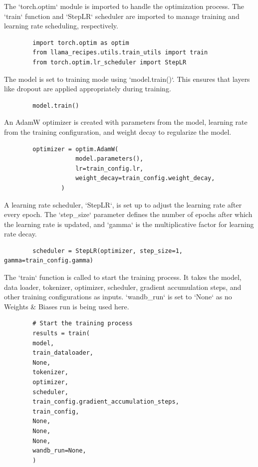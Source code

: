 \documentclass{solutionclass} %
\begin{document}
\begin{solution}
	The `torch.optim` module is imported to handle the optimization process. The `train` function and `StepLR` scheduler are imported to manage training and learning rate scheduling, respectively.
	\begin{lstlisting}
		import torch.optim as optim
		from llama_recipes.utils.train_utils import train
		from torch.optim.lr_scheduler import StepLR
	\end{lstlisting}
\end{solution}

\begin{solution}
	The model is set to training mode using `model.train()`. This ensures that layers like dropout are applied appropriately during training.
	\begin{lstlisting}
		model.train()
	\end{lstlisting}
\end{solution}

\begin{solution}
	An AdamW optimizer is created with parameters from the model, learning rate from the training configuration, and weight decay to regularize the model.
	\begin{lstlisting}
		optimizer = optim.AdamW(
					model.parameters(),
					lr=train_config.lr,
					weight_decay=train_config.weight_decay,
				)
		\end{lstlisting}
\end{solution}

\begin{solution}
	A learning rate scheduler, `StepLR`, is set up to adjust the learning rate after every epoch. The `step\_size` parameter defines the number of epochs after which the learning rate is updated, and `gamma` is the multiplicative factor for learning rate decay.
	\begin{lstlisting}
		scheduler = StepLR(optimizer, step_size=1, gamma=train_config.gamma)
	\end{lstlisting}
\end{solution}

\begin{solution}
	The `train` function is called to start the training process. It takes the model, data loader, tokenizer, optimizer, scheduler, gradient accumulation steps, and other training configurations as inputs. `wandb\_run` is set to `None` as no Weights \& Biases run is being used here.
	\begin{lstlisting}
		# Start the training process
		results = train(
		model,
		train_dataloader,
		None,
		tokenizer,
		optimizer,
		scheduler,
		train_config.gradient_accumulation_steps,
		train_config,
		None,
		None,
		None,
		wandb_run=None,
		)
	\end{lstlisting}
\end{solution}
\end{document}
